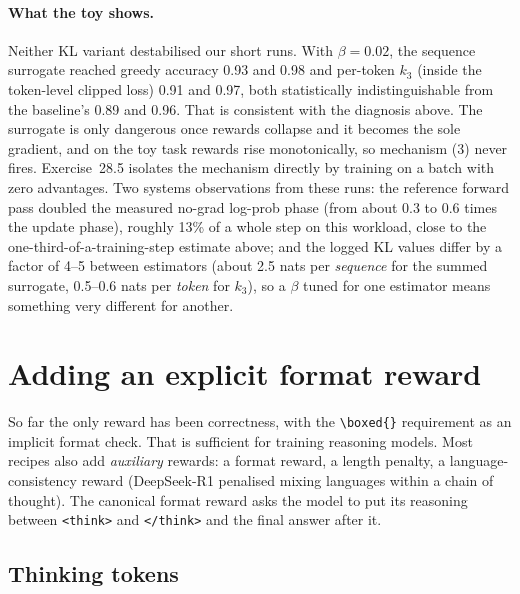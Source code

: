 \paragraph{What the toy shows.} Neither KL variant destabilised our short runs.
With $\beta=0.02$, the sequence surrogate reached greedy accuracy 0.93 and 0.98 and per-token
$k_3$ (inside the token-level clipped loss) 0.91 and 0.97, both statistically
indistinguishable from the baseline's 0.89 and 0.96. That is consistent with the diagnosis
above. The surrogate is only dangerous once rewards collapse and it becomes the sole
gradient, and on the toy task rewards rise monotonically, so mechanism (3) never fires.
Exercise~28.5 isolates the mechanism directly by training on a batch with zero advantages.
Two systems observations from these runs: the reference forward pass doubled the measured
no-grad log-prob phase (from about 0.3 to 0.6 times the update phase), roughly 13\% of a
whole step on this workload, close to the one-third-of-a-training-step estimate above; and the logged KL values differ by a factor of 4--5 between estimators
(about 2.5 nats per \emph{sequence} for the summed surrogate, 0.5--0.6 nats per \emph{token}
for $k_3$), so a $\beta$ tuned for one estimator means something very different for
another.


\section{Adding an explicit format reward}\label{sec:grpo2:format}

So far the only reward has been correctness, with the \verb|\boxed{}| requirement as an
implicit format check. That is sufficient for training reasoning models. Most recipes also add
\emph{auxiliary} rewards: a format reward, a length penalty, a language-consistency reward
(DeepSeek-R1 penalised mixing languages within a chain of thought). The canonical format
reward asks the model to put its reasoning between \verb|<think>| and \verb|</think>| and the
final answer after it.

\subsection{Thinking tokens}\label{sec:grpo2:think}

